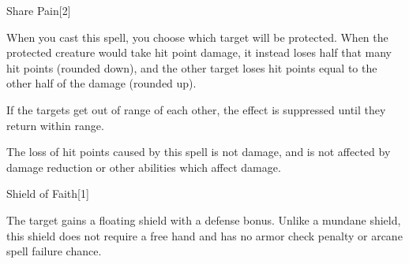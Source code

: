 \begin{spellsection}{Share Pain}[2]
    \begin{spellheader}
    \end{spellheader}
    \begin{spellcontent}
        \begin{spelltargetinginfo}
        \end{spelltargetinginfo}
        \begin{spelleffects}
            \spellspecial When you cast this spell, you choose which target will be protected.
            \spelleffect When the protected creature would take hit point damage, it instead loses half that many hit points (rounded down), and the other target loses hit points equal to the other half of the damage (rounded up).

            If the targets get out of range of each other, the effect is suppressed until they return within range.
            \spelldur \durlong \dismissable
        \end{spelleffects}
    \end{spellcontent}
    \begin{spellfooter}
        \spellnotes The loss of hit points caused by this spell is not damage, and is not affected by damage reduction or other abilities which affect damage.
        \miscastexplode
    \end{spellfooter}
\end{spellsection}

\begin{spellsection}{Shield of Faith}[1]
    \begin{spellheader}
    \end{spellheader}
    \begin{spellcontent}
        \begin{spelltargetinginfo}
        \end{spelltargetinginfo}
        \begin{spelleffects}
            \spelleffect The target gains a floating shield with a  defense bonus. Unlike a mundane shield, this shield does not require a free hand and has no armor check penalty or arcane spell failure chance.
            \spelldur \durpersonallong
        \end{spelleffects}
    \end{spellcontent}
    \begin{spellfooter}
        \miscastexplode
    \end{spellfooter}
\end{spellsection}

